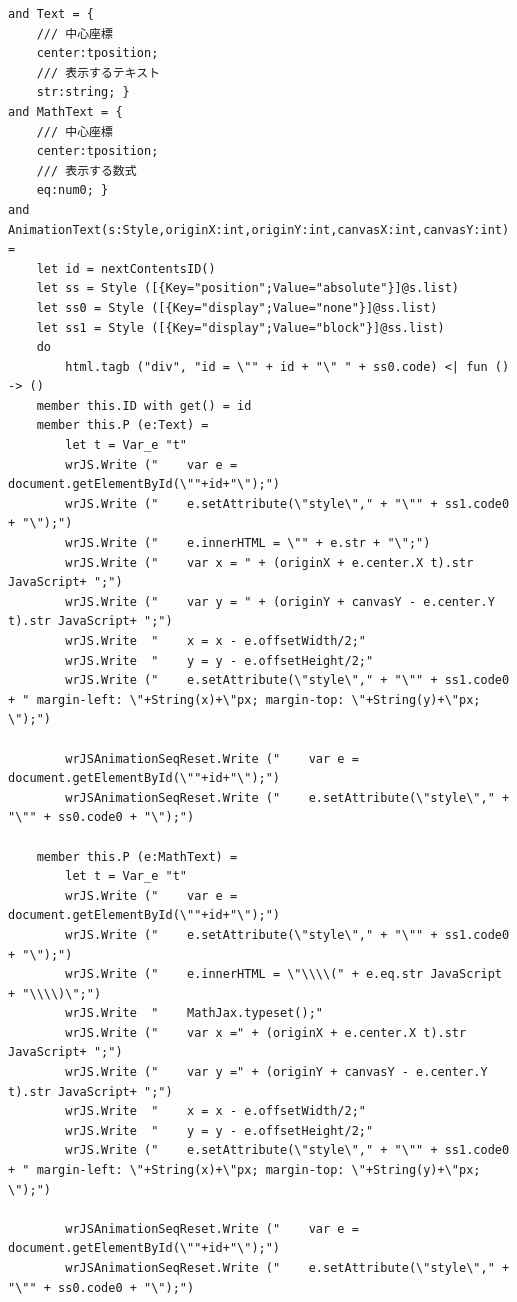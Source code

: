  \begin{lstlisting}[caption={テキスト・数式のアニメーション},label={text},breaklines=true,breakatwhitespace=false]
and Text = {
    /// 中心座標
    center:tposition;
    /// 表示するテキスト
    str:string; }
and MathText = {
    /// 中心座標
    center:tposition;
    /// 表示する数式
    eq:num0; }
and AnimationText(s:Style,originX:int,originY:int,canvasX:int,canvasY:int) =
    let id = nextContentsID()
    let ss = Style ([{Key="position";Value="absolute"}]@s.list)
    let ss0 = Style ([{Key="display";Value="none"}]@ss.list)
    let ss1 = Style ([{Key="display";Value="block"}]@ss.list)
    do
        html.tagb ("div", "id = \"" + id + "\" " + ss0.code) <| fun () -> ()
    member this.ID with get() = id
    member this.P (e:Text) = 
        let t = Var_e "t"
        wrJS.Write ("    var e = document.getElementById(\""+id+"\");")
        wrJS.Write ("    e.setAttribute(\"style\"," + "\"" + ss1.code0 + "\");")
        wrJS.Write ("    e.innerHTML = \"" + e.str + "\";")
        wrJS.Write ("    var x = " + (originX + e.center.X t).str JavaScript+ ";")
        wrJS.Write ("    var y = " + (originY + canvasY - e.center.Y t).str JavaScript+ ";")
        wrJS.Write  "    x = x - e.offsetWidth/2;"
        wrJS.Write  "    y = y - e.offsetHeight/2;"
        wrJS.Write ("    e.setAttribute(\"style\"," + "\"" + ss1.code0 + " margin-left: \"+String(x)+\"px; margin-top: \"+String(y)+\"px; \");")
        
        wrJSAnimationSeqReset.Write ("    var e = document.getElementById(\""+id+"\");")
        wrJSAnimationSeqReset.Write ("    e.setAttribute(\"style\"," + "\"" + ss0.code0 + "\");")
        
    member this.P (e:MathText) = 
        let t = Var_e "t"
        wrJS.Write ("    var e = document.getElementById(\""+id+"\");")
        wrJS.Write ("    e.setAttribute(\"style\"," + "\"" + ss1.code0 + "\");")
        wrJS.Write ("    e.innerHTML = \"\\\\(" + e.eq.str JavaScript + "\\\\)\";")
        wrJS.Write  "    MathJax.typeset();"
        wrJS.Write ("    var x =" + (originX + e.center.X t).str JavaScript+ ";")
        wrJS.Write ("    var y =" + (originY + canvasY - e.center.Y t).str JavaScript+ ";")
        wrJS.Write  "    x = x - e.offsetWidth/2;"
        wrJS.Write  "    y = y - e.offsetHeight/2;"
        wrJS.Write ("    e.setAttribute(\"style\"," + "\"" + ss1.code0 + " margin-left: \"+String(x)+\"px; margin-top: \"+String(y)+\"px; \");")
        
        wrJSAnimationSeqReset.Write ("    var e = document.getElementById(\""+id+"\");")
        wrJSAnimationSeqReset.Write ("    e.setAttribute(\"style\"," + "\"" + ss0.code0 + "\");")
\end{lstlisting}

